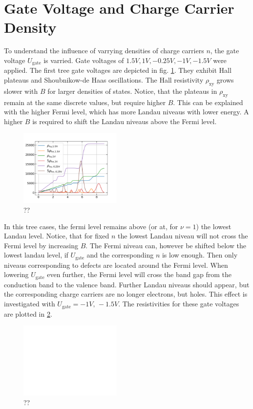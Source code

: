 \section{Gate Voltage and Charge Carrier Density}

To understand the influence of varrying densities of charge carriers $n$, the gate voltage $U_\text{gate}$ is varried. 
Gate voltages of  $1.5V, 1V, -0.25V, -1V, -1.5V$ were applied.
The first tree gate voltages are depicted in fig. \ref{fig:differentGateVoltagesQHE}.
They exhibit Hall plateaus and Shoubnikow-de Haas oscillations.
The Hall resistivity $\rho_\text{xy}$ grows slower with $B$ for larger densities of states.
Notice, that the plateaus in $\rho_\text{xy}$ remain at the same discrete values, but require higher $B$.
This can be explained with the higher Fermi level, which has more Landau niveaus with lower energy.
A higher $B$ is required to shift the Landau niveaus above the Fermi level.
\begin{figure}[h]
    \centering
    \includegraphics[width=0.45\textwidth]{../Images/differentGateVoltagesQHE.png}
    \caption{??}
    \label{fig:differentGateVoltagesQHE}
\end{figure}
In this tree cases, the fermi level remains above (or at, for $\nu=1$) the lowest Landau level.
Notice, that for fixed $n$ the lowest Landau niveau will not cross the Fermi level by increasing $B$.
The Fermi niveau can, however be shifted below the lowest landau level, if $U_\text{gate}$ and the corresponding $n$ is low enough.
Then only niveaus corresponding to defects are located around the Fermi level.
When lowering $U_\text{gate}$ even further, the Fermi level will cross the band gap from the conduction band to the valence band.
Further Landau niveaus should appear, but the corresponding charge carriers are no longer electrons, but holes.
This effect is investigated with $U_\text{gate}=-1V,\,-1.5V$.
The resistivities for these gate voltages are plotted in \ref{fig:kaputteKurvenGateV}.
\begin{figure}[h]
    \centering
    \includegraphics[width=0.45\textwidth]{../Images/kaputteKurvenGateV.png}
    \caption{??}
    \label{fig:kaputteKurvenGateV}
\end{figure}
